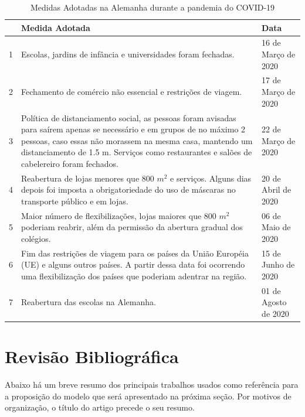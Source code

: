 \documentclass[12pt]{article}
\begin{document}
\begin{table}[h]
\centering
\begin{small}
\caption{Medidas Adotadas na Alemanha durante a pandemia do COVID-19} \label{Tabela1}
\begin{tabular}{|p{1cm}|p{10cm}|p{3.5cm}|}
\hline
             & Medida Adotada & Data\\
\hline
1& Escolas, jardins de infância e universidades foram fechadas.          & 16 de Março de 2020 \\
\hline
2& Fechamento de comércio não essencial e restrições de viagem.          & 17 de Março de 2020 \\
\hline

3& Política de distanciamento social, as pessoas foram avisadas para saírem apenas se necessário e em grupos de no máximo 2 pessoas, caso essas não morassem na mesma casa, mantendo um distanciamento de 1.5 m. Serviços como restaurantes e salões de cabelereiro foram fechados.  & 22 de Março de 2020 \\

\hline

4 & Reabertura de lojas menores que 800 $m^2$ e serviços. Alguns dias depois foi imposta a obrigatoriedade do uso de máscaras no transporte público e em lojas. & 20 de Abril de 2020 \\

\hline
5 & Maior número de flexibilizações, lojas maiores que 800 $m^2$ poderiam reabrir, além da permissão da abertura gradual dos colégios. & 06 de Maio de 2020 \\

\hline

6 & Fim das restrições de viagem para os países da União Européia (UE) e alguns outros países. A partir dessa data foi ocorrendo uma flexibilização dos países que poderiam adentrar na região. & 15 de Junho de 2020\\
\hline 

7 & Reabertura das escolas na Alemanha. & 01 de Agosto de 2020\\
\hline
\end{tabular}
\end{small}
\end{table}



\section{Revisão Bibliográfica}
Abaixo há um breve resumo dos principais trabalhos usados como referência para a proposição do modelo que será apresentado na próxima seção. Por motivos de organização, o título do artigo precede o seu resumo. 
\end{document}
